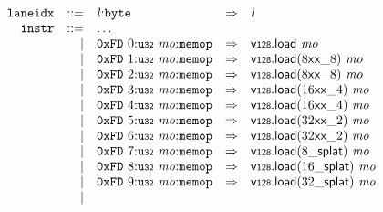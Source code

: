 \vspace{1ex}

$$
\begin{array}{@{}l@{}rrlll@{}l@{}}
& {\mathtt{laneidx}} &::=& {\mathit{l}}{:}{\mathtt{byte}} &\Rightarrow& {\mathit{l}} \\
& {\mathtt{instr}} &::=& \dots \\ &&|&
\mathtt{0xFD}~0{:}{\mathtt{u{\scriptstyle32}}}~{\mathit{mo}}{:}{\mathtt{memop}} &\Rightarrow& \mathsf{v{\scriptstyle128}.load}~{\mathit{mo}} \\ &&|&
\mathtt{0xFD}~1{:}{\mathtt{u{\scriptstyle32}}}~{\mathit{mo}}{:}{\mathtt{memop}} &\Rightarrow& {\mathsf{v{\scriptstyle128}.load}}{({{{{8}{\mathsf{x}}}{\mathsf{x}}}{\mathsf{\_}}}{8})}~{\mathit{mo}} \\ &&|&
\mathtt{0xFD}~2{:}{\mathtt{u{\scriptstyle32}}}~{\mathit{mo}}{:}{\mathtt{memop}} &\Rightarrow& {\mathsf{v{\scriptstyle128}.load}}{({{{{8}{\mathsf{x}}}{\mathsf{x}}}{\mathsf{\_}}}{8})}~{\mathit{mo}} \\ &&|&
\mathtt{0xFD}~3{:}{\mathtt{u{\scriptstyle32}}}~{\mathit{mo}}{:}{\mathtt{memop}} &\Rightarrow& {\mathsf{v{\scriptstyle128}.load}}{({{{{16}{\mathsf{x}}}{\mathsf{x}}}{\mathsf{\_}}}{4})}~{\mathit{mo}} \\ &&|&
\mathtt{0xFD}~4{:}{\mathtt{u{\scriptstyle32}}}~{\mathit{mo}}{:}{\mathtt{memop}} &\Rightarrow& {\mathsf{v{\scriptstyle128}.load}}{({{{{16}{\mathsf{x}}}{\mathsf{x}}}{\mathsf{\_}}}{4})}~{\mathit{mo}} \\ &&|&
\mathtt{0xFD}~5{:}{\mathtt{u{\scriptstyle32}}}~{\mathit{mo}}{:}{\mathtt{memop}} &\Rightarrow& {\mathsf{v{\scriptstyle128}.load}}{({{{{32}{\mathsf{x}}}{\mathsf{x}}}{\mathsf{\_}}}{2})}~{\mathit{mo}} \\ &&|&
\mathtt{0xFD}~6{:}{\mathtt{u{\scriptstyle32}}}~{\mathit{mo}}{:}{\mathtt{memop}} &\Rightarrow& {\mathsf{v{\scriptstyle128}.load}}{({{{{32}{\mathsf{x}}}{\mathsf{x}}}{\mathsf{\_}}}{2})}~{\mathit{mo}} \\ &&|&
\mathtt{0xFD}~7{:}{\mathtt{u{\scriptstyle32}}}~{\mathit{mo}}{:}{\mathtt{memop}} &\Rightarrow& {\mathsf{v{\scriptstyle128}.load}}{({{8}{\mathsf{\_}}}{\mathsf{splat}})}~{\mathit{mo}} \\ &&|&
\mathtt{0xFD}~8{:}{\mathtt{u{\scriptstyle32}}}~{\mathit{mo}}{:}{\mathtt{memop}} &\Rightarrow& {\mathsf{v{\scriptstyle128}.load}}{({{16}{\mathsf{\_}}}{\mathsf{splat}})}~{\mathit{mo}} \\ &&|&
\mathtt{0xFD}~9{:}{\mathtt{u{\scriptstyle32}}}~{\mathit{mo}}{:}{\mathtt{memop}} &\Rightarrow& {\mathsf{v{\scriptstyle128}.load}}{({{32}{\mathsf{\_}}}{\mathsf{splat}})}~{\mathit{mo}} \\ &&|&

\end{array}$$
